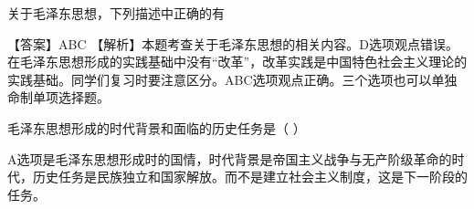\question 关于毛泽东思想，下列描述中正确的有
\par{}
\begin{solution}【答案】ABC
【解析】本题考查关于毛泽东思想的相关内容。D选项观点错误。在毛泽东思想形成的实践基础中没有``改革''，改革实践是中国特色社会主义理论的实践基础。同学们复习时要注意区分。ABC选项观点正确。三个选项也可以单独命制单项选择题。
\end{solution}
\question 毛泽东思想形成的时代背景和面临的历史任务是（ ）
\par{}
\begin{solution}A选项是毛泽东思想形成时的国情，时代背景是帝国主义战争与无产阶级革命的时代，历史任务是民族独立和国家解放。而不是建立社会主义制度，这是下一阶段的任务。
\end{solution}
